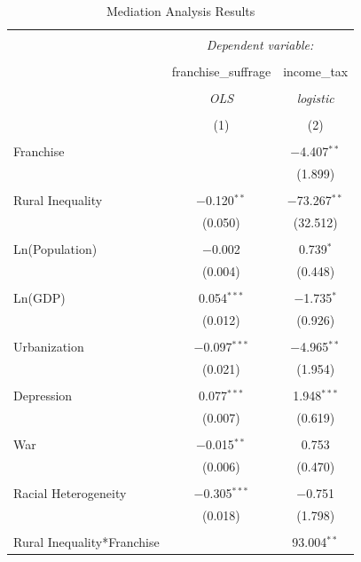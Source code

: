 \documentclass[letter, 12pt]{article}
\begin{document}
\begin{table}[!htbp] \centering 
	\caption{Mediation Analysis Results} 
	\label{} 
	\begin{tabular}{@{\extracolsep{5pt}}lcc} 
		\\[-1.8ex]\hline 
		\hline \\[-1.8ex] 
		& \multicolumn{2}{c}{\textit{Dependent variable:}} \\ 
		\cline{2-3} 
		\\[-1.8ex] & franchise\_suffrage & income\_tax \\ 
		\\[-1.8ex] & \textit{OLS} & \textit{logistic} \\ 
		\\[-1.8ex] & (1) & (2)\\ 
		\hline \\[-1.8ex] 
		Franchise &  & {\cellcolor{gray!30}$-$4.407$^{**}$} \\ 
		&  & {\cellcolor{gray!30}(1.899)} \\ 
		& & \\ 
		Rural Inequality & {\cellcolor{gray!30}$-$0.120$^{**}$}& $-$73.267$^{**}$ \\ 
		& {\cellcolor{gray!30}(0.050)} & (32.512) \\ 
		& & \\ 
		Ln(Population) & $-$0.002 & 0.739$^{*}$ \\ 
		& (0.004) & (0.448) \\ 
		& & \\ 
		Ln(GDP) & 0.054$^{***}$ & $-$1.735$^{*}$ \\ 
		& (0.012) & (0.926) \\ 
		& & \\ 
		Urbanization & $-$0.097$^{***}$ & $-$4.965$^{**}$ \\ 
		& (0.021) & (1.954) \\ 
		& & \\ 
		Depression & 0.077$^{***}$ & 1.948$^{***}$ \\ 
		& (0.007) & (0.619) \\ 
		& & \\ 
		War & $-$0.015$^{**}$ & 0.753 \\ 
		& (0.006) & (0.470) \\ 
		& & \\ 
		Racial Heterogeneity & $-$0.305$^{***}$ & $-$0.751 \\ 
		& (0.018) & (1.798) \\ 
		& & \\ 
		Rural Inequality*Franchise &  & 93.004$^{**}$ \\ 

\end{tabular}
\end{table}
\end{document}
